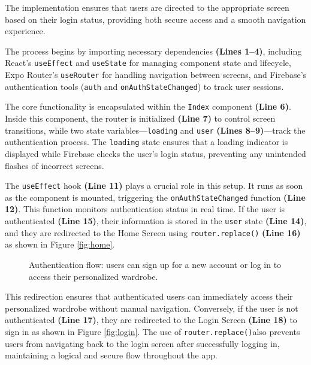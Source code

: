The implementation ensures that users are directed to the appropriate screen based on their login status, providing both secure access and a smooth navigation experience.

The process begins by importing necessary dependencies \textbf{(Lines 1–4)}, including React’s \texttt{useEffect} and \texttt{useState} for managing component state and lifecycle, Expo Router’s \texttt{useRouter} for handling navigation between screens, and Firebase’s authentication tools (\texttt{auth} and \texttt{onAuthStateChanged}) to track user sessions.

The core functionality is encapsulated within the \texttt{Index} component \textbf{(Line 6)}. Inside this component, the router is initialized \textbf{(Line 7)} to control screen transitions, while two state variables—\texttt{loading} and \texttt{user} \textbf{(Lines 8–9)}—track the authentication process. The \texttt{loading} state ensures that a loading indicator is displayed while Firebase checks the user’s login status, preventing any unintended flashes of incorrect screens.

The \texttt{useEffect} hook \textbf{(Line 11)} plays a crucial role in this setup. It runs as soon as the component is mounted, triggering the \texttt{onAuthStateChanged} function \textbf{(Line 12)}. This function monitors authentication status in real time. If the user is authenticated \textbf{(Line 15)}, their information is stored in the \texttt{user} state \textbf{(Line 14)}, and they are redirected to the Home Screen using \texttt{router.replace()} \textbf{(Line 16)} as shown in Figure \ref{fig:home}. 

\begin{figure}[!ht]
    \centering
    \qquad %
    \caption{Authentication flow: users can sign up for a new account or log in to access their personalized wardrobe.}
    \label{fig:auth_flow}
\end{figure}

This redirection ensures that authenticated users can immediately access their personalized wardrobe without manual navigation. Conversely, if the user is not authenticated \textbf{(Line 17)}, they are redirected to the Login Screen \textbf{(Line 18)} to sign in as shown in Figure \ref{fig:login}. The use of \texttt{router.replace()}also prevents users from navigating back to the login screen after successfully logging in, maintaining a logical and secure flow throughout the app.

